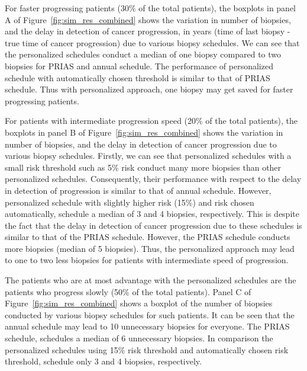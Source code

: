 For faster progressing patients (30\% of the total patients), the boxplots in panel A of Figure~\ref{fig:sim_res_combined} shows the variation in number of biopsies, and the delay in detection of cancer progression, in years (time of last biopsy - true time of cancer progression) due to various biopsy schedules. We can see that the personalized schedules conduct a median of one biopsy compared to two biopsies for PRIAS and annual schedule. The performance of personalized schedule with automatically chosen threshold is similar to that of PRIAS schedule. Thus with personalized approach, one biopsy may get saved for faster progressing patients.

For patients with intermediate progression speed (20\% of the total patients), the boxplots in panel B of Figure~\ref{fig:sim_res_combined} shows the variation in number of biopsies, and the delay in detection of cancer progression due to various biopsy schedules. Firstly, we can see that personalized schedules with a small risk threshold such as 5\% risk conduct many more biopsies than other personalized schedules. Consequently, their performance with respect to the delay in detection of progression is similar to that of annual schedule. However, personalized schedule with slightly higher risk (15\%) and risk chosen automatically, schedule a median of 3 and 4 biopsies, respectively. This is despite the fact that the delay in detection of cancer progression due to these schedules is similar to that of the PRIAS schedule. However, the PRIAS schedule conducts more biopsies (median of 5 biopsies). Thus, the personalized approach may lead to one to two less biopsies for patients with intermediate speed of progression.

The patients who are at most advantage with the personalized schedules are the patients who progress slowly (50\% of the total patients). Panel C of Figure~\ref{fig:sim_res_combined} shows a boxplot of the number of biopsies conducted by various biopsy schedules for such patients. It can be seen that the annual schedule may lead to 10 unnecessary biopsies for everyone. The PRIAS schedule, schedules a median of 6 unnecessary biopsies. In comparison the personalized schedules using 15\% risk threshold and automatically chosen risk threshold, schedule only 3 and 4 biopsies, respectively.

